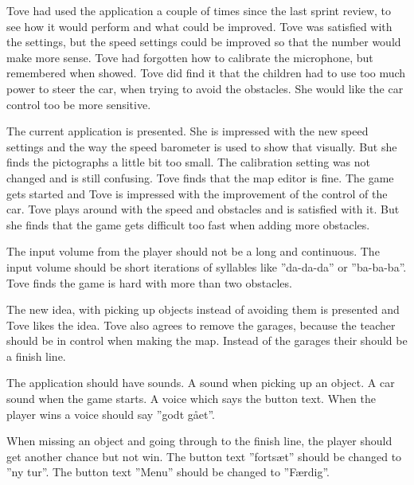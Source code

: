 \label{interview_tove_8_5}
Tove had used the application a couple of times since the last sprint review, to see how it would perform and what could be improved.
Tove was satisfied with the settings, but the speed settings could be improved so that the number would make more sense.
Tove had forgotten how to calibrate the microphone, but remembered when showed.
Tove did find it that the children had to use too much power to steer the car, when trying to avoid the obstacles.
She would like the car control too be more sensitive.


The current application is presented.
She is impressed with the new speed settings and the way the speed barometer is used to show that visually.
But she finds the pictographs a little bit too small.
The calibration setting was not changed and is still confusing.
Tove finds that the map editor is fine.
The game gets started and Tove is impressed with the improvement of the control of the car.
Tove plays around with the speed and obstacles and is satisfied with it.
But she finds that the game gets difficult too fast when adding more obstacles.


The input volume from the player should not be a long and continuous.
The input volume should be short iterations of syllables like ''da-da-da'' or ''ba-ba-ba''.
Tove finds the game is hard with more than two obstacles.


The new idea, with picking up objects instead of avoiding them is presented and Tove likes the idea.
Tove also agrees to remove the garages, because the teacher should be in control when making the map.
Instead of the garages their should be a finish line.


The application should have sounds.
A sound when picking up an object.
A car sound when the game starts.
A voice which says the button text.
When the player wins a voice should say ''godt gået''.

When missing an object and going through to the finish line, the player should get another chance but not win.
The button text ''fortsæt'' should be changed to ''ny tur''.
The button text ''Menu'' should be changed to ''Færdig''.